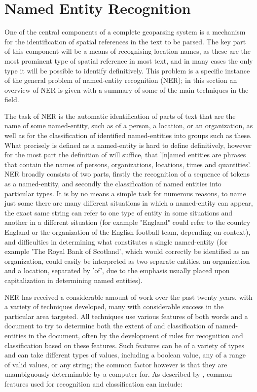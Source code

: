 \documentclass[12pt, a4paper]{report}
\begin{document}
\section{Named Entity Recognition}

One of the central components of a complete geoparsing system is a mechanism for the identification of spatial references in the text to be parsed. The key part of this component will be a means of recognising location names, as these are the most prominent type of spatial reference in most text, and in many cases the only type it will be possible to identify definitively. This problem is a specific instance of the general problem of named-entity recognition (NER); in this section an overview of NER is given with a summary of some of the main techniques in the field.

The task of NER is the automatic identification of parts of text that are the name of some named-entity, such as of a person, a location, or an organization, as well as for the classification of identified named-entities into groups such as these. What precisely is defined as a named-entity is hard to define definitively, however for the most part the definition of \citet{website:conll2002} will suffice, that '[n]amed entities are phrases that contain the names of persons, organizations, locations, times and quantities'. NER broadly consists of two parts, firstly the recognition of a sequence of tokens as a named-entity, and secondly the classification of named entities into particular types. It is by no means a simple task for numerous reasons, to name just some there are many different situations in which a named-entity can appear, the exact same string can refer to one type of entity in some situations and another in a different situation (for example "England" could refer to the country England or the organization of the English football team, depending on context), and difficulties in determining what constitutes a single named-entity (for example 'The Royal Bank of Scotland', which would correctly be identified as an organization, could easily be interpreted as two separate entities, an organization and a location, separated by 'of', due to the emphasis usually placed upon capitalization in determining named entities).

NER has received a considerable amount of work over the past twenty years, with a variety of techniques developed, many with considerable success in the particular area targeted. All techniques use various features of both words and a document to try to determine both the extent of and classification of named-entities in the document, often by the development of rules for recognition and classification based on these features. Such features can be of a variety of types and can take different types of values, including a boolean value, any of a range of valid values, or any string; the common factor however is that they are unambiguously determinable by a computer for. As described by \citet{nadeau2009}, common features used for recognition and classification can include:
\end{document}
